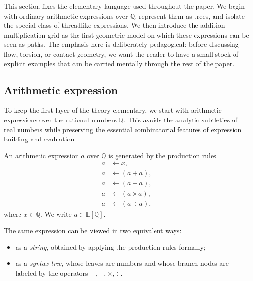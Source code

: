 This section fixes the elementary language used throughout the paper. We begin with ordinary arithmetic expressions over $\mathbb{Q}$, represent them as trees, and isolate the special class of threadlike expressions. We then introduce the addition--multiplication grid as the first geometric model on which these expressions can be seen as paths. The emphasis here is deliberately pedagogical: before discussing flow, torsion, or contact geometry, we want the reader to have a small stock of explicit examples that can be carried mentally through the rest of the paper.

\subsection{Arithmetic expression}\label{subsec:arithmetic-expression}

To keep the first layer of the theory elementary, we start with arithmetic expressions over the rational numbers $\mathbb{Q}$. This avoids the analytic subtleties of real numbers while preserving the essential combinatorial features of expression building and evaluation.

\begin{definition}\label{def:arithmetic-expression}
An arithmetic expression $a$ over $\mathbb{Q}$ is generated by the production rules
\begin{equation}\label{eq:productionrule}
\begin{aligned}
a &\longleftarrow x, \\
a &\longleftarrow (a+a), \\
a &\longleftarrow (a-a), \\
a &\longleftarrow (a\times a), \\
a &\longleftarrow (a\div a),
\end{aligned}
\end{equation}
where $x\in\mathbb{Q}$. We write $a\in \mathbb{E}[\mathbb{Q}]$.
\end{definition}

The same expression can be viewed in two equivalent ways:
\begin{itemize}
    \item as a \emph{string}, obtained by applying the production rules formally;
    \item as a \emph{syntax tree}, whose leaves are numbers and whose branch nodes are labeled by the operators $+, -, \times, \div$.
\end{itemize}

